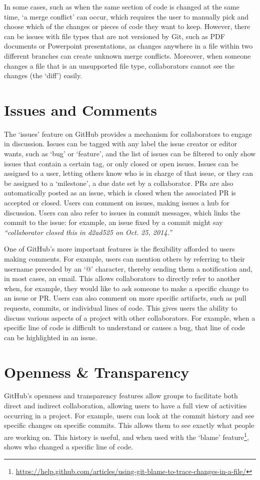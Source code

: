 In some cases, such as when the same section of code is changed at the same time, `a merge conflict' can occur, which requires the user to manually pick and choose which of the changes or pieces of code they want to keep. However, there can be issues with file types that are not versioned by Git, such as PDF documents or Powerpoint presentations, as changes anywhere in a file within two different branches can create unknown merge conflicts. Moreover, when someone changes a file that is an unsupported file type, collaborators cannot see the changes (the `diff') easily.

\section{Issues and Comments}
The `issues' feature on GitHub provides a mechanism for collaborators to engage in discussion. Issues can be tagged with any label the issue creator or editor wants, such as `bug' or `feature', and the list of issues can be filtered to only show issues that contain a certain tag, or only closed or open issues. Issues can be assigned to a user, letting others know who is in charge of that issue, or they can be assigned to a `milestone', a due date set by a collaborator. PRs are also automatically posted as an issue, which is closed when the associated PR is accepted or closed. Users can comment on issues, making issues a hub for discussion. Users can also refer to issues in commit messages, which links the commit to the issue: for example, an issue fixed by a commit might say \textit{``collaborator closed this in d2ad525 on Oct. 25, 2014.''}

One of GitHub's more important features is the flexibility afforded to users making comments. For example, users can mention others by referring to their username preceded by an `@' character, thereby sending them a notification and, in most cases, an email. This allows collaborators to directly refer to another when, for example, they would like to ask someone to make a specific change to an issue or PR. Users can also comment on more specific artifacts, such as pull requests, commits, or individual lines of code. This gives users the ability to discuss various aspects of a project with other collaborators. For example, when a specific line of code is difficult to understand or causes a bug, that line of code can be highlighted in an issue.

\section{Openness \& Transparency}
GitHub's openness and transparency features allow groups to facilitate both direct and indirect collaboration, allowing users to have a full view of activities occurring in a project. For example, users can look at the commit history and see specific changes on specific commits. This allows them to see exactly what people are working on. This history is useful, and when used with the `blame' feature\footnote{\url{https://help.github.com/articles/using-git-blame-to-trace-changes-in-a-file/}}, shows who changed a specific line of code.

